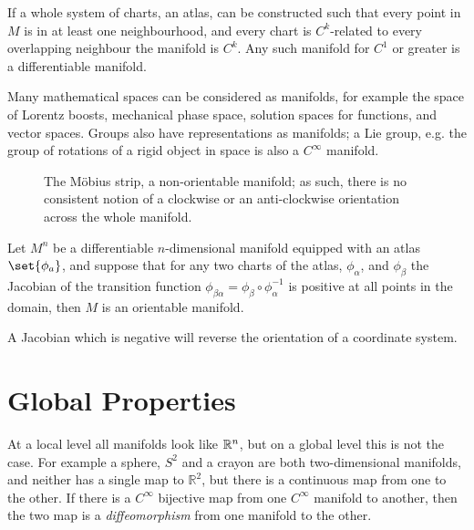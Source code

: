 If a whole system of charts, an atlas, can be constructed such that
every point in $M$ is in at least one neighbourhood, and every chart
is $C^k$-related to every overlapping neighbour the manifold is
$C^k$. Any such manifold for $C^1$ or greater is a differentiable
manifold.

Many mathematical spaces can be considered as manifolds, for example
the space of Lorentz boosts, mechanical phase space, solution spaces
for functions, and vector spaces. Groups also have representations as
manifolds; a Lie group, e.g. the group of rotations of a rigid object
in space is also a $C^{\infty}$ manifold.

\begin{figure}[b]
  \centering
  
  \caption{The M\"obius strip, a non-orientable manifold; as such,
    there is no consistent notion of a clockwise or an anti-clockwise
    orientation across the whole manifold.}
  \label{fig:mobius}
\end{figure}

\begin{definition}[Orientability]
  Let $M^n$ be a differentiable $n$-dimensional manifold equipped with
  an atlas $\set{\phi_a}$, and suppose that for any two charts of the
  atlas, $\phi_{\alpha}$, and $\phi_{\beta}$ the Jacobian of the
  transition function $\phi_{\beta \alpha} = \phi_{\beta} \circ
  \phi_{\alpha}^{-1}$ is positive at all points in the domain, then
  $M$ is an orientable manifold.
\end{definition}
A Jacobian which is negative will reverse the orientation of a
coordinate system.

\section{Global Properties}
\label{sec:global-properties}

At a local level all manifolds look like $\mathbb{R}^n$, but on a global level
this is not the case. For example a sphere, $S^2$ and a crayon are
both two-dimensional manifolds, and neither has a single map to
$\mathbb{R}^2$, but there is a continuous map from one to the other.
If there is a $C^{\infty}$ bijective map from one $C^{\infty}$
manifold to another, then the two map is a \emph{diffeomorphism} from
one manifold to the other.

